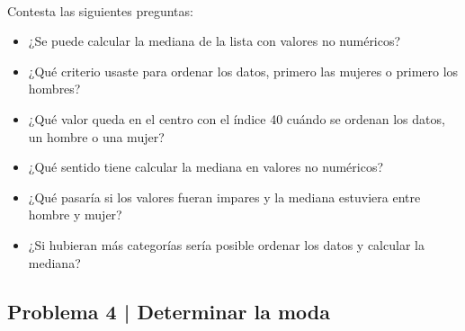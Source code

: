 \documentclass{article}
\begin{document}
\\
Contesta las siguientes preguntas:
\begin{itemize}
    \item ¿Se puede calcular la mediana de la lista con valores no numéricos?
    \item ¿Qué criterio usaste para ordenar los datos, primero las mujeres o primero los hombres?
    \item ¿Qué valor queda en el centro con el índice 40 cuándo se ordenan los datos, un hombre o una mujer?
    \item ¿Qué sentido tiene calcular la mediana en valores no numéricos?
    \item ¿Qué pasaría si los valores fueran impares y la mediana estuviera entre hombre y mujer?
    \item ¿Si hubieran más categorías sería posible ordenar los datos y calcular la mediana?
\end{itemize}

\clearpage

\subsection{Problema 4 | Determinar la moda}
\end{document}
